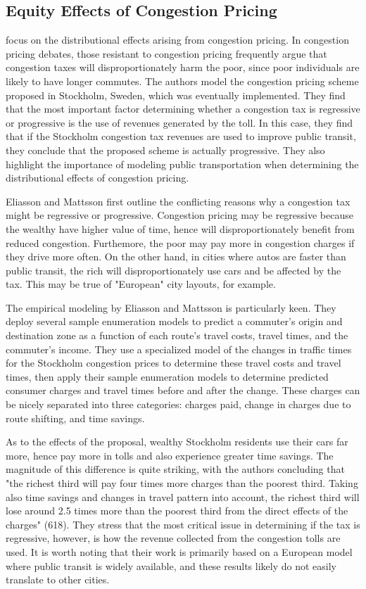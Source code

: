 \documentclass[JEL]{AEA}
\begin{document}
\subsection{Equity Effects of Congestion Pricing}

\cite{eliasson-2006} focus on the distributional effects arising from congestion pricing. In congestion pricing debates, those resistant to congestion pricing frequently argue that congestion taxes will disproportionately harm the poor, since poor individuals are likely to have longer commutes. The authors model the congestion pricing scheme proposed in Stockholm, Sweden, which was eventually implemented. They find that the most important factor determining whether a congestion tax is regressive or progressive is the use of revenues generated by the toll. In this case, they find that if the Stockholm congestion tax revenues are used to improve public transit, they conclude that the proposed scheme is actually progressive. They also highlight the importance of modeling public transportation when determining the distributional effects of congestion pricing.

Eliasson and Mattsson first outline the conflicting reasons why a congestion tax might be regressive or progressive. Congestion pricing may be regressive because the wealthy have higher value of time, hence will disproportionately benefit from reduced congestion. Furthemore, the poor may pay more in congestion charges if they drive more often. On the other hand, in cities where autos are faster than public transit, the rich will disproportionately use cars and be affected by the tax. This may be true of "European" city layouts, for example.

The empirical modeling by Eliasson and Mattsson is particularly keen. They deploy several sample enumeration models to predict a commuter's origin and destination zone as a function of each route's travel costs, travel times, and the commuter's income. They use a specialized model of the changes in traffic times for the Stockholm congestion prices to determine these travel costs and travel times, then apply their sample enumeration models to determine predicted consumer charges and travel times before and after the change. These charges can be nicely separated into three categories: charges paid, change in charges due to route shifting, and time savings.

As to the effects of the proposal, wealthy Stockholm residents use their cars far more, hence pay more in tolls and also experience greater time savings. The magnitude of this difference is quite striking, with the authors concluding that "the richest third will pay four times more charges than the poorest third. Taking also time savings and changes in travel pattern into account, the richest third will lose around 2.5 times more than the poorest third from the direct effects of the charges" (618). They stress that the most critical issue in determining if the tax is regressive, however, is how the revenue collected from the congestion tolls are used. It is worth noting that their work is primarily based on a European model where public transit is widely available, and these results likely do not easily translate to other cities.
\end{document}
